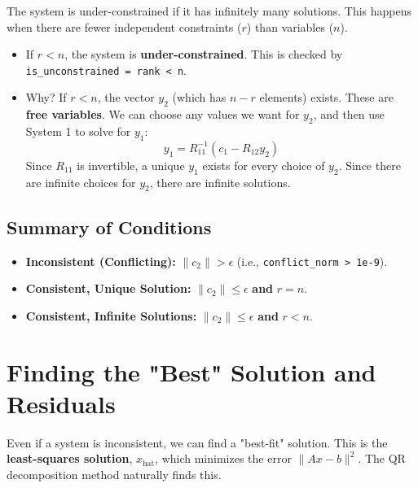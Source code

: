 \documentclass[11pt, a4paper]{article}
\begin{document}
The system is under-constrained if it has infinitely many solutions. This happens when there are fewer independent constraints ($r$) than variables ($n$).
\begin{itemize}
    \item If $r < n$, the system is \textbf{under-constrained}. This is checked by \texttt{is\_unconstrained = rank < n}.
    \item Why? If $r < n$, the vector $y_2$ (which has $n-r$ elements) exists. These are \textbf{free variables}. We can choose any values we want for $y_2$, and then use System 1 to solve for $y_1$:
    $$
    y_1 = R_{11}^{-1} (c_1 - R_{12} y_2)
    $$
    Since $R_{11}$ is invertible, a unique $y_1$ exists for every choice of $y_2$. Since there are infinite choices for $y_2$, there are infinite solutions.
\end{itemize}

\subsection{Summary of Conditions}
\begin{itemize}
    \item \textbf{Inconsistent (Conflicting):} $\|c_2\| > \epsilon$ (i.e., \texttt{conflict\_norm > 1e-9}).
    \item \textbf{Consistent, Unique Solution:} $\|c_2\| \le \epsilon$ \textbf{and} $r = n$.
    \item \textbf{Consistent, Infinite Solutions:} $\|c_2\| \le \epsilon$ \textbf{and} $r < n$.
\end{itemize}

\section{Finding the "Best" Solution and Residuals}

Even if a system is inconsistent, we can find a "best-fit" solution. This is the \textbf{least-squares solution}, $x_{\text{hat}}$, which minimizes the error $\|Ax - b\|^2$. The QR decomposition method naturally finds this.
\end{document}
